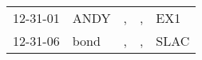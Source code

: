 \begin{supertabular}{lllll}
 12-31-01 &  ANDY &  , &  , &   EX1 \\
 12-31-06 &  bond &  , &  , &  SLAC \\
\end{supertabular}
